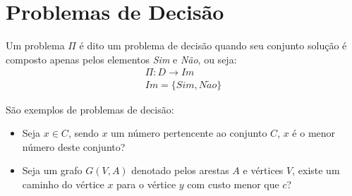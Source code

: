 \section{Problemas de Decisão} \label{sec:problemaDecisao}

Um problema $\Pi$ é dito um problema de decisão quando seu conjunto solução é composto apenas pelos elementos \textit{Sim} e \textit{Não}, ou seja:
\begin{equation} \label{eq:problemaDecisao}
\begin{split}
\Pi: D \rightarrow Im  \\
Im = \{ Sim, N\widetilde{a}o \}
\end{split}
\end{equation}

São exemplos de problemas de decisão:
\begin{itemize}
    \item Seja $x \in C$, sendo $x$ um número pertencente ao conjunto $C$, $x$ é o menor número deste conjunto?
    \item Seja um grafo $G(V,A)$ denotado pelos arestas $A$ e vértices $V$, existe um caminho do vértice $x$ para o vértice $y$ com custo menor que $c$?
\end{itemize}
